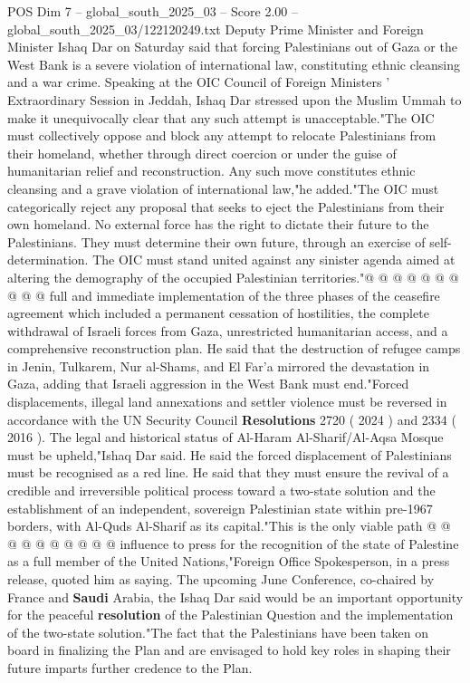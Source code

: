 \begin{textsample}{POS Dim 7 – global\_south\_2025\_03 – Score 2.00 – global\_south\_2025\_03/122120249.txt}  \label{ex:f7_pos_091}
Deputy Prime Minister and Foreign Minister Ishaq Dar on Saturday said that forcing Palestinians out of Gaza or the West Bank is a severe violation of international law, constituting ethnic cleansing and a war crime.
Speaking at the OIC Council of Foreign Ministers ' Extraordinary Session in Jeddah, Ishaq Dar stressed upon the Muslim Ummah to make it unequivocally clear that any such attempt is unacceptable."The OIC must collectively oppose and block any attempt to relocate Palestinians from their homeland, whether through direct coercion or under the guise of humanitarian relief and reconstruction.
Any such move constitutes ethnic cleansing and a grave violation of international law,"he added."The OIC must categorically reject any proposal that seeks to eject the Palestinians from their own homeland.
No external force has the right to dictate their future to the Palestinians.
They must determine their own future, through an exercise of self-determination.
The OIC must stand united against any sinister agenda aimed at altering the demography of the occupied Palestinian territories."@ @ @ @ @ @ @ @ @ @ full and immediate implementation of the three phases of the ceasefire agreement which included a permanent cessation of hostilities, the complete withdrawal of Israeli forces from Gaza, unrestricted humanitarian access, and a comprehensive reconstruction plan.
He said that the destruction of refugee camps in Jenin, Tulkarem, Nur al-Shams, and El Far'a mirrored the devastation in Gaza, adding that Israeli aggression in the West Bank must end."Forced displacements, illegal land annexations and settler violence must be reversed in accordance with the UN Security Council \textbf{Resolutions} 2720 ( 2024 ) and 2334 ( 2016 ).
The legal and historical status of Al-Haram Al-Sharif/Al-Aqsa Mosque must be upheld,"Ishaq Dar said.
He said the forced displacement of Palestinians must be recognised as a red line.
He said that they must ensure the revival of a credible and irreversible political process toward a two-state solution and the establishment of an independent, sovereign Palestinian state within pre-1967 borders, with Al-Quds Al-Sharif as its capital."This is the only viable path @ @ @ @ @ @ @ @ @ @ influence to press for the recognition of the state of Palestine as a full member of the United Nations,"Foreign Office Spokesperson, in a press release, quoted him as saying.
The upcoming June Conference, co-chaired by France and \textbf{Saudi} Arabia, the Ishaq Dar said would be an important opportunity for the peaceful \textbf{resolution} of the Palestinian Question and the implementation of the two-state solution."The fact that the Palestinians have been taken on board in finalizing the Plan and are envisaged to hold key roles in shaping their future imparts further credence to the Plan.

\end{textsample}
